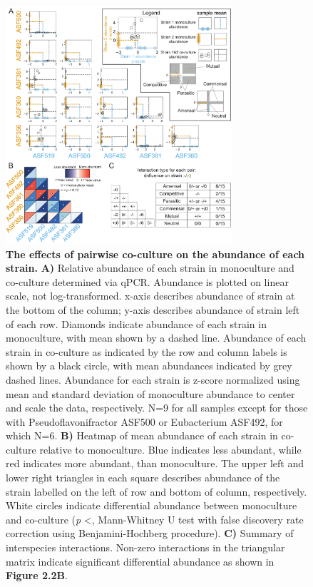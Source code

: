 \documentclass[11pt,twocolumn,notitlepage,openany,twoside]{book}
\begin{document}
\begin{refsection}
\begin{figure}
\centering
\includegraphics[width=0.75\textwidth]{ch2_fig2}
\caption[The effects of pairwise co-culture on the abundance of each strain.]{\textbf{The effects of pairwise co-culture on the abundance of each strain.} \textbf{A)} Relative abundance of each strain in monoculture and co-culture determined via qPCR. Abundance is plotted on linear scale, not log-transformed. x-axis describes abundance of strain at the bottom of the column; y-axis describes abundance of strain left of each row. Diamonds indicate abundance of each strain in monoculture, with mean shown by a dashed line. Abundance of each strain in co-culture as indicated by the row and column labels is shown by a black circle, with mean abundances indicated by grey dashed lines. Abundance for each strain is z-score normalized using mean and standard deviation of monoculture abundance to center and scale the data, respectively. N=9 for all samples except for those with Pseudoflavonifractor ASF500 or Eubacterium ASF492, for which N=6. \textbf{B)} Heatmap of mean abundance of each strain in co-culture relative to monoculture. Blue indicates less abundant, while red indicates more abundant, than monoculture. The upper left and lower right triangles in each square describes abundance of the strain labelled on the left of row and bottom of column, respectively. White circles indicate differential abundance between monoculture and co-culture (\textit{p} \textless{}, Mann-Whitney U test with false discovery rate correction using Benjamini-Hochberg procedure). \textbf{C)} Summary of interspecies interactions. Non-zero interactions in the triangular matrix indicate significant differential abundance as shown in \textbf{Figure 2.2B}.}
\end{figure}


\end{refsection}
\end{document}
